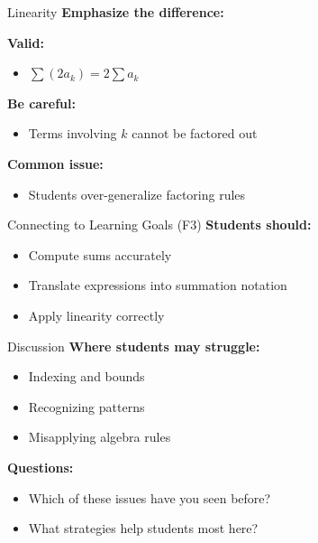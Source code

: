 \documentclass[dvipsnames]{beamer}
\begin{document}
\begin{frame}{Linearity}
\textbf{Emphasize the difference:}

\vspace{1em}

\textbf{Valid:}
\begin{itemize}
\item $\sum (2a_k) = 2\sum a_k$
\end{itemize}

\textbf{Be careful:}
\begin{itemize}
\item Terms involving $k$ cannot be factored out
\end{itemize}

\vspace{1em}

\textbf{Common issue:}
\begin{itemize}
\item Students over-generalize factoring rules
\end{itemize}
\end{frame}


\begin{frame}{Connecting to Learning Goals (F3)}
\textbf{Students should:}
\begin{itemize}
\item Compute sums accurately
\item Translate expressions into summation notation
\item Apply linearity correctly
\end{itemize}

\end{frame}


\begin{frame}{Discussion}
\textbf{Where students may struggle:}
\begin{itemize}
\item Indexing and bounds
\item Recognizing patterns
\item Misapplying algebra rules
\end{itemize}

\vspace{1em}

\textbf{Questions:}
\begin{itemize}
\item Which of these issues have you seen before?
\item What strategies help students most here?
\end{itemize}
\end{frame}
\end{document}
